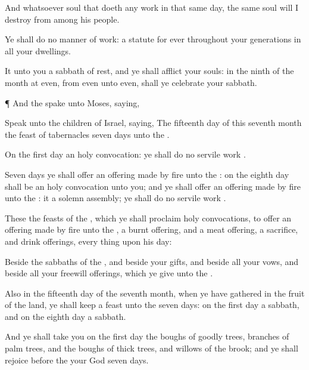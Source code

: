 {And whatsoever
soul
{} that
doeth any
work in that
same
day, the same
soul will I
destroy from
among his
people.

Ye shall
do no manner of
work:
{} a
statute for
ever throughout your
generations in all your
dwellings.

It
{} unto you a
sabbath of
rest, and ye shall
afflict your
souls: in the
ninth
{} of the
month at
even, from
even unto
even, shall ye
celebrate your
sabbath.


\par }{\PP {}¶ And the
{}
spake unto
Moses,
saying,

Speak unto the
children of
Israel,
saying, The
fifteenth
day of this
seventh
month
{} the
feast of
tabernacles
{}
seven
days unto the
{}.

On the
first
day
{} an
holy
convocation: ye shall
do no
servile
work
{}.

Seven
days ye shall
offer an offering made by
fire unto the
{}: on the
eighth
day shall be an
holy
convocation unto you; and ye shall
offer an offering made by
fire unto the
{}: it
{} a solemn
assembly;
{} ye shall
do no
servile
work
{}.

These
{} the
feasts of the
{}, which ye shall
proclaim
{}
holy
convocations, to
offer an offering made by
fire unto the
{}, a burnt
offering, and a meat
offering, a
sacrifice, and drink
offerings, every
thing upon
his
day:

Beside the
sabbaths of the
{}, and beside your
gifts, and beside all your
vows, and beside all your freewill
offerings, which ye
give unto the
{}.

Also in the
fifteenth
day of the
seventh
month, when ye have
gathered in the
fruit of the
land, ye shall
keep a
feast unto the
{}
seven
days: on the
first
day
{} a
sabbath, and on the
eighth
day
{} a
sabbath.

And ye shall
take you on the
first
day the
boughs of
goodly
trees,
branches of
palm trees, and the
boughs of
thick
trees, and
willows of the
brook; and ye shall
rejoice
before the
{} your
God
seven
days.

}
